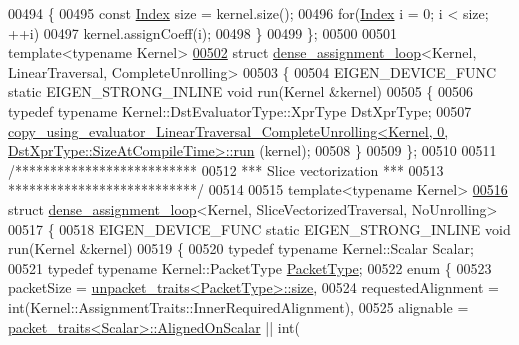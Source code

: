 \begin{DoxyCode}
00494   \{
00495     \textcolor{keyword}{const} \hyperlink{namespace_eigen_a62e77e0933482dafde8fe197d9a2cfde}{Index} size = kernel.size();
00496     \textcolor{keywordflow}{for}(\hyperlink{namespace_eigen_a62e77e0933482dafde8fe197d9a2cfde}{Index} i = 0; i < size; ++i)
00497       kernel.assignCoeff(i);
00498   \}
00499 \};
00500 
00501 \textcolor{keyword}{template}<\textcolor{keyword}{typename} Kernel>
\hyperlink{struct_eigen_1_1internal_1_1dense__assignment__loop_3_01_kernel_00_01_linear_traversal_00_01_complete_unrolling_01_4}{00502} \textcolor{keyword}{struct }\hyperlink{struct_eigen_1_1internal_1_1dense__assignment__loop}{dense\_assignment\_loop}<Kernel, LinearTraversal, CompleteUnrolling>
00503 \{
00504   EIGEN\_DEVICE\_FUNC \textcolor{keyword}{static} EIGEN\_STRONG\_INLINE \textcolor{keywordtype}{void} run(Kernel &kernel)
00505   \{
00506     \textcolor{keyword}{typedef} \textcolor{keyword}{typename} Kernel::DstEvaluatorType::XprType DstXprType;
00507     
      \hyperlink{struct_eigen_1_1internal_1_1copy__using__evaluator___linear_traversal___complete_unrolling}{copy\_using\_evaluator\_LinearTraversal\_CompleteUnrolling<Kernel, 0, DstXprType::SizeAtCompileTime>::run}
      (kernel);
00508   \}
00509 \};
00510 
00511 \textcolor{comment}{/**************************}
00512 \textcolor{comment}{*** Slice vectorization ***}
00513 \textcolor{comment}{***************************/}
00514 
00515 \textcolor{keyword}{template}<\textcolor{keyword}{typename} Kernel>
\hyperlink{struct_eigen_1_1internal_1_1dense__assignment__loop_3_01_kernel_00_01_slice_vectorized_traversal_00_01_no_unrolling_01_4}{00516} \textcolor{keyword}{struct }\hyperlink{struct_eigen_1_1internal_1_1dense__assignment__loop}{dense\_assignment\_loop}<Kernel, SliceVectorizedTraversal, NoUnrolling>
00517 \{
00518   EIGEN\_DEVICE\_FUNC \textcolor{keyword}{static} EIGEN\_STRONG\_INLINE \textcolor{keywordtype}{void} run(Kernel &kernel)
00519   \{
00520     \textcolor{keyword}{typedef} \textcolor{keyword}{typename} Kernel::Scalar Scalar;
00521     \textcolor{keyword}{typedef} \textcolor{keyword}{typename} Kernel::PacketType \hyperlink{struct_eigen_1_1_packet_type}{PacketType};
00522     \textcolor{keyword}{enum} \{
00523       packetSize = \hyperlink{struct_eigen_1_1internal_1_1unpacket__traits}{unpacket\_traits<PacketType>::size},
00524       requestedAlignment = int(Kernel::AssignmentTraits::InnerRequiredAlignment),
00525       alignable = \hyperlink{struct_eigen_1_1internal_1_1packet__traits}{packet\_traits<Scalar>::AlignedOnScalar} || int(

\end{DoxyCode}
